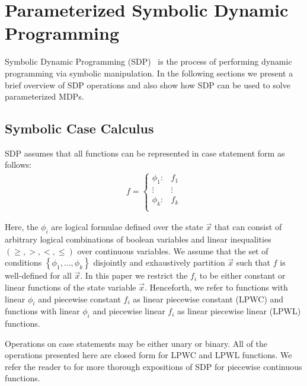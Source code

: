 \section{Parameterized Symbolic Dynamic Programming}
\label{sec:sdp}

Symbolic Dynamic Programming (SDP)~\parencite{Boutilier_IJCAI_2001} is the process of performing dynamic programming
via symbolic manipulation. In the following sections we present a brief overview of SDP operations and also show
how SDP can be used to solve parameterized MDPs.

\subsection{Symbolic Case Calculus}

SDP assumes that all functions can be represented in case statement form \parencite{Boutilier_IJCAI_2001} as follows:
{\footnotesize 
    \abovedisplayskip=5pt
    \belowdisplayskip=0pt
    \begin{align*}
        f = 
        \begin{cases}
            \phi_1: & f_1 \\ 
            \vdots & \vdots\\ 
            \phi_k: & f_k \\ 
        \end{cases}
    \end{align*}
}%

Here, the $\phi_i$ are logical formulae defined over the state $\vec{x}$ that can consist of arbitrary logical combinations of boolean variables and linear inequalities $\left( \geq, >, <, \leq \right)$ over continuous variables. We assume that the set of conditions $\left\lbrace \phi_1, \ldots, \phi_k \right\rbrace$ disjointly and exhaustively partition $\vec{x}$ such that $f$ is well-defined for all $\vec{x}$.  In this paper we restrict the $f_i$ to be either constant or linear functions of the state variable $\vec{x}$. Henceforth, we refer to functions with linear $\phi_i$ and piecewise constant $f_i$ as linear piecewise constant (LPWC) and functions with linear $\phi_i$ and piecewise linear $f_i$ as linear piecewise linear (LPWL) functions.

Operations on case statements may be either unary or binary. All of the operations presented here are closed form for LPWC and LPWL functions. We refer the reader to \parencite{Sanner_UAI_2011,Zamani_AAAI_2012} for more thorough expositions of SDP for piecewise continuous functions.

